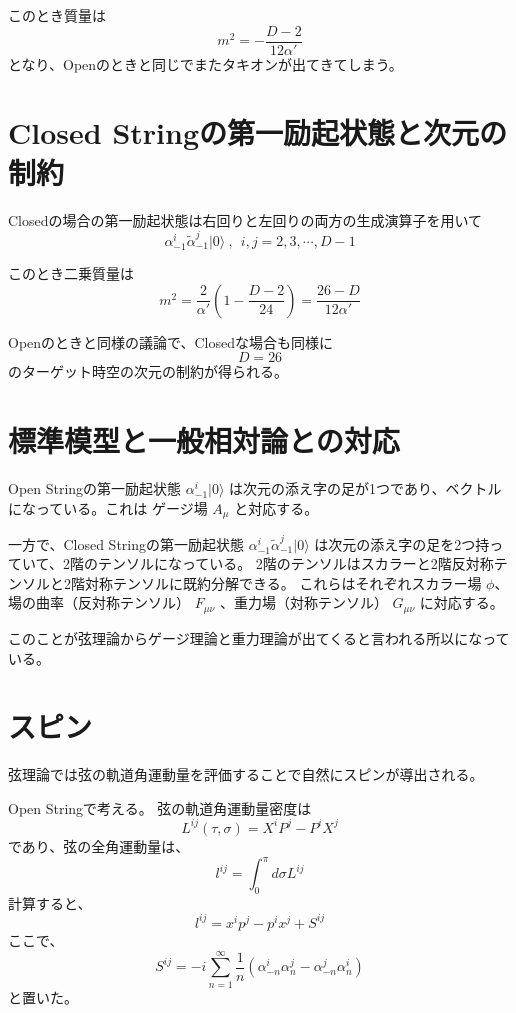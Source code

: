 \documentclass[uplatex]{jsarticle}
\begin{document}
このとき質量は
$$
	m^{2}
	= - \frac{D-2}{12 \alpha'}
$$
となり、Openのときと同じでまたタキオンが出てきてしまう。

\section{Closed Stringの第一励起状態と次元の制約}

Closedの場合の第一励起状態は右回りと左回りの両方の生成演算子を用いて
$$
	\alpha^{i}_{-1}
	\tilde{\alpha}^{j}_{-1}
	| 0 \rangle
	\ , \ \ i, j = 2,3,\cdots, D-1
$$

このとき二乗質量は
$$
	m^{2}
	=
	\frac{2}{\alpha'}
	\left(
	1 - \frac{D-2}{24}
	\right)
	=
	\frac{26 - D}{12 \alpha'}
$$

Openのときと同様の議論で、Closedな場合も同様に
$$
	D=26
$$
のターゲット時空の次元の制約が得られる。

\section{標準模型と一般相対論との対応}

Open Stringの第一励起状態
$
	\alpha^{i}_{-1}
	| 0 \rangle
$
は次元の添え字の足が1つであり、ベクトルになっている。これは
ゲージ場
$A_{\mu}$
と対応する。


一方で、Closed Stringの第一励起状態
$
	\alpha^{i}_{-1}
	\tilde{\alpha}^{j}_{-1}
	| 0 \rangle
$
は次元の添え字の足を2つ持っていて、2階のテンソルになっている。
2階のテンソルはスカラーと2階反対称テンソルと2階対称テンソルに既約分解できる。
これらはそれぞれスカラー場 $\phi$、場の曲率（反対称テンソル） $F_{\mu \nu}$ 、重力場（対称テンソル） $G_{\mu \nu}$ に対応する。

このことが弦理論からゲージ理論と重力理論が出てくると言われる所以になっている。

\section{スピン}

弦理論では弦の軌道角運動量を評価することで自然にスピンが導出される。

Open Stringで考える。
弦の軌道角運動量密度は
$$
	L^{ij}(\tau, \sigma)
	=
	X^{i} P^{j}
	-
	P^{i} X^{j}
$$
であり、弦の全角運動量は、
$$
	l^{ij}
	=
	\int^{\pi}_{0} d \sigma
	L^{ij}
$$
計算すると、
$$
	l^{ij}
	=
	x^{i} p^{j}
	-
	p^{i} x^{j}
	+
	S^{ij}
$$
ここで、
$$
	S^{ij}
	=
	-i \sum_{n=1}^{\infty} \frac{1}{n}
	(
	\alpha^{i}_{-n} \alpha^{j}_{n}
	-
	\alpha^{j}_{-n} \alpha^{i}_{n}
	)
$$
と置いた。
\end{document}
